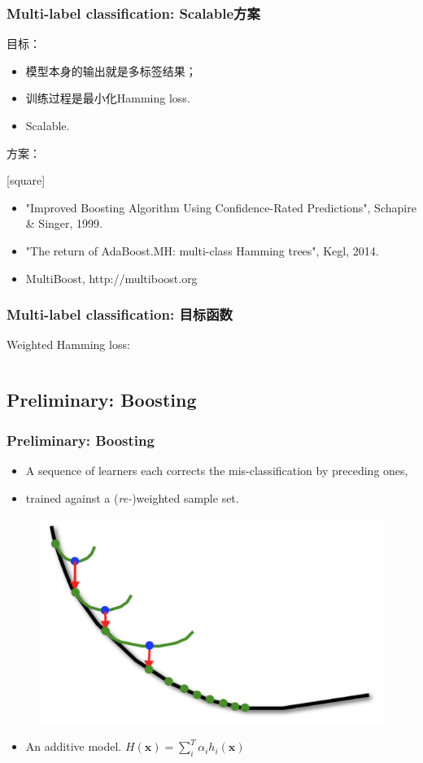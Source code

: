 \documentclass{beamer}
\begin{document}
\begin{frame}
\frametitle{Multi-label classification: Scalable方案}
目标：
  \begin{itemize}
    \item 模型本身的输出就是多标签结果；
    \item 训练过程是最小化Hamming loss.
    \item Scalable.
  \end{itemize}

方案：
  {
    [square]
    \begin{itemize}
      \item {\color{purple} "Improved Boosting Algorithm Using Confidence-Rated Predictions", Schapire \& Singer, 1999.} \\
      \item {\color{purple} "The return of AdaBoost.MH: multi-class Hamming trees", Kegl, 2014.} \\
      \item {\color{purple} MultiBoost, http://multiboost.org}
    \end{itemize}
  }
\end{frame}



\begin{frame}
\frametitle{Multi-label classification: 目标函数}

Weighted Hamming loss: 

$$$$

\end{frame}

\subsection{Preliminary: Boosting}

\begin{frame}
\frametitle{Preliminary: Boosting}
\begin{itemize}
\item A sequence of learners each corrects the mis-classification by preceding ones,
\item trained against a (\textit{re-})weighted sample set.
\end{itemize}

\begin{figure}
\includegraphics[width=.5\linewidth]{img/boosting.png}
\end{figure}
\begin{itemize}
\item An additive model. $H(\mathbf{x}) = \sum_i^T \alpha_i h_i(\mathbf{x})$
\end{itemize}
\end{frame}
\end{document}
